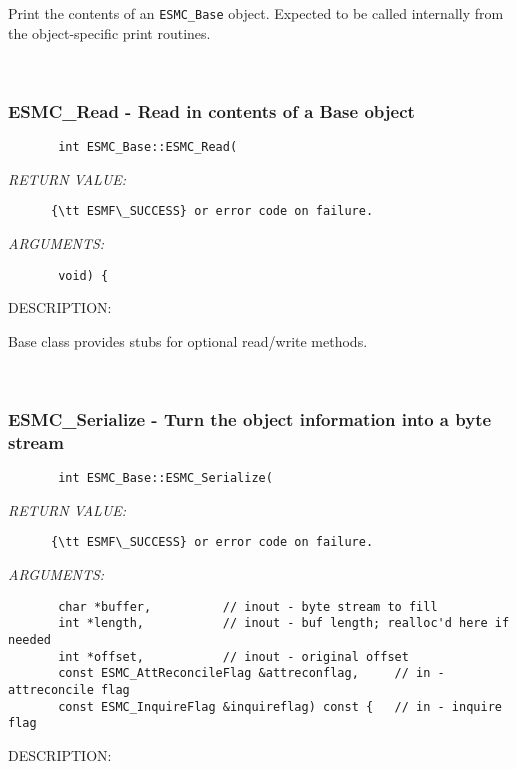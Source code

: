       Print the contents of an {\tt ESMC\_Base} object.  Expected to be
      called internally from the object-specific print routines.
   
 
\mbox{}\hrulefill\
 
\subsubsection [ESMC\_Read] {ESMC\_Read - Read in contents of a Base object}


  
\begin{verbatim}       int ESMC_Base::ESMC_Read(\end{verbatim}{\em RETURN VALUE:}
\begin{verbatim}      {\tt ESMF\_SUCCESS} or error code on failure.\end{verbatim}{\em ARGUMENTS:}
\begin{verbatim}       void) {\end{verbatim}
{\sf DESCRIPTION:\\ }


      Base class provides stubs for optional read/write methods.
   
 
\mbox{}\hrulefill\
 
\subsubsection [ESMC\_Serialize] {ESMC\_Serialize - Turn the object information into a byte stream}


  
\begin{verbatim}       int ESMC_Base::ESMC_Serialize(\end{verbatim}{\em RETURN VALUE:}
\begin{verbatim}      {\tt ESMF\_SUCCESS} or error code on failure.\end{verbatim}{\em ARGUMENTS:}
\begin{verbatim}       char *buffer,          // inout - byte stream to fill
       int *length,           // inout - buf length; realloc'd here if needed
       int *offset,           // inout - original offset
       const ESMC_AttReconcileFlag &attreconflag,     // in - attreconcile flag
       const ESMC_InquireFlag &inquireflag) const {   // in - inquire flag\end{verbatim}
{\sf DESCRIPTION:\\ }


